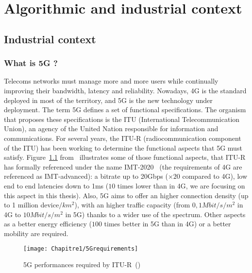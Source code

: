 
\chapter{Algorithmic and industrial context}
\label{chap:context}
\minitoc

\section{Industrial context}
\subsection{What is 5G ?}



Telecoms networks must manage more and more users while continually improving their bandwidth, latency and reliability. Nowadays, 4G is the standard deployed in most of the territory, and 5G is the new technology under deployment. The term 5G defines a set of functional specifications. The organism that proposes these specifications is the ITU (International Telecommunication Union), an agency of the United Nation responsible for information and communications. For several years, the ITU-R (radiocommunication component of the ITU) has been working to determine the functional aspects that 5G must satisfy. Figure~\ref{fig:5gperf} from~\cite{dahlman20185g} illustrates some of those functional aspects, that ITU-R has formally referenced under the name IMT-2020~\cite{romano2019imt} (the requirements of 4G are referenced as IMT-advanced): a bitrate up to 20Gbps ($\times 20$ compared to 4G), low end to end latencies down to 1ms ($10$ times lower than in 4G, we are focusing on this aspect in this thesis).
Also, 5G aims to offer an higher connection density (up to 1 million device$/km^2$), with an higher traffic capacity (from $0,1 Mbit/s/m^2$ in 4G to $10 Mbit/s/m^2$ in 5G) thanks to a wider use of the spectrum. Other aspects as a better energy efficiency ($100$ times better in 5G than in 4G) or a better mobility are required. 

  \begin{figure}[h]
      \begin{center}
      \texttt{[image: Chapitre1/5Grequirements]}
      \end{center}
      \caption{5G performances required by ITU-R~(\cite{dahlman20185g})}\label{fig:5gperf}
      \end{figure}

